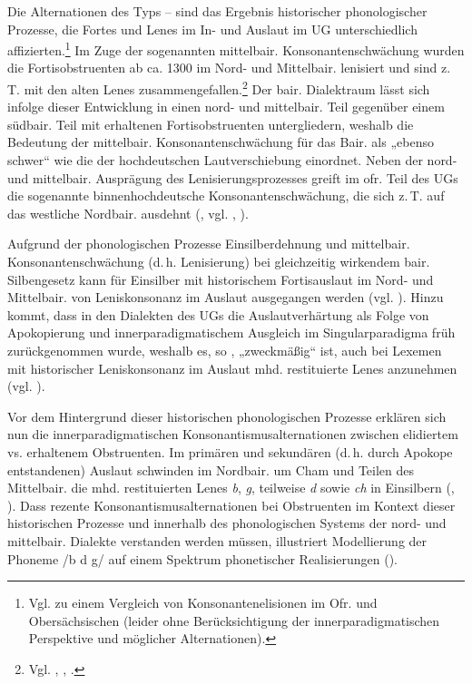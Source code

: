 Die Alternationen des Typs  --  sind das Ergebnis historischer phonologischer Prozesse, die Fortes und Lenes im In- und Auslaut im UG unterschiedlich affizierten.\footnote{Vgl. \citet[81--88]{Franke1895} zu einem Vergleich von Konsonantenelisionen im Ofr. und Obersächsischen (leider ohne Berücksichtigung der innerparadigmatischen Perspektive und möglicher Alternationen).} Im Zuge der sogenannten mittelbair. Konsonantenschwächung wurden die Fortisobstruenten ab ca. 1300 im Nord- und Mittelbair. lenisiert und sind z.\,T. mit den alten Lenes zusammengefallen.\footnote{Vgl. \citet[§34a und Karte 21]{Kranzmayer1956}, \citet[78--79]{Rowley1997}, \citet[271 und 302]{Schirmunski1962}.} Der bair. Dialektraum lässt sich infolge dieser Entwicklung in einen nord- und mittelbair. Teil gegenüber einem südbair. Teil mit erhaltenen Fortisobstruenten untergliedern, weshalb \citet[§34a2]{Kranzmayer1956} die Bedeutung der mittelbair. Konsonantenschwächung für das Bair. als „ebenso schwer“ wie die der hochdeutschen Lautverschiebung einordnet. Neben der nord- und mittelbair. Ausprägung des Lenisierungsprozesses greift im ofr. Teil des UGs die sogenannte binnenhochdeutsche Konsonantenschwächung, die sich z.\,T. auf das westliche Nordbair. ausdehnt (, vgl. \citealt[§34c1]{Kranzmayer1956}, \citealt[78]{Rowley1997}).

Aufgrund der phonologischen Prozesse Einsilberdehnung und mittelbair. Konsonantenschwächung (d.\,h. Lenisierung) bei gleichzeitig wirkendem bair. Silbengesetz kann für Einsilber mit historischem Fortisauslaut im Nord- und Mittelbair. von Leniskonsonanz im Auslaut ausgegangen werden (vgl. \citealt[28]{Grundler1951}). Hinzu kommt, dass in den Dialekten des UGs die Auslautverhärtung als Folge von Apokopierung und innerparadigmatischem Ausgleich im Singularparadigma früh zurückgenommen wurde, weshalb es, so \citet[78]{Rowley1997}, „zweckmäßig“ ist, auch bei Lexemen mit historischer Leniskonsonanz im Auslaut mhd. restituierte Lenes anzunehmen (vgl. \citealt[§27d]{Kranzmayer1956}).\largerpage[1.5]

Vor dem Hintergrund dieser historischen phonologischen Prozesse erklären sich nun die innerparadigmatischen Konsonantismusalternationen zwischen elidiertem vs. erhaltenem Obstruenten. Im primären und sekundären (d.\,h. durch Apokope entstandenen) Auslaut schwinden im Nordbair. um Cham und Teilen des Mittelbair. die mhd. restituierten Lenes \textit{b}, \textit{g}, teilweise \textit{d} sowie \textit{ch} in Einsilbern (\citealt[78]{Rowley1997}, \citealt[§28b2, 29c, 30b3, 33c]{Kranzmayer1956}). Dass rezente Konsonantismusalternationen bei Obstruenten im Kontext dieser historischen Prozesse und innerhalb des phonologischen Systems der nord- und mittelbair. Dialekte verstanden werden müssen, illustriert  Modellierung der Phoneme /b d g/ auf einem Spektrum phonetischer Realisierungen ().\pagebreak

